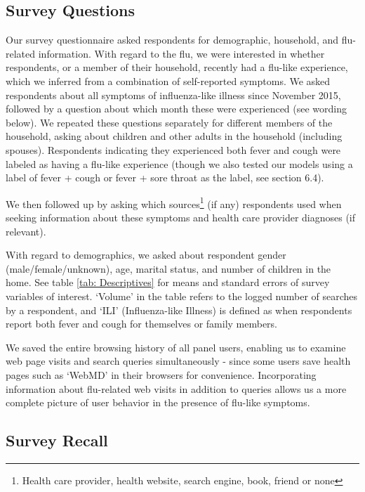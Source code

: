 \documentclass[12pt]{article}
\begin{document}
\subsection{Survey Questions}

Our survey questionnaire asked respondents for demographic, household, and flu-related information. With regard to the flu, we were interested in whether respondents, or a member of their household, recently had a flu-like experience, which we inferred from a combination of self-reported symptoms. We asked respondents about all symptoms of influenza-like illness since November 2015, followed by a question about which month these were experienced (see wording below). We repeated these questions separately for different members of the household, asking about children and other adults in the household (including spouses). Respondents indicating they experienced both fever and cough were labeled as having a flu-like experience (though we also tested our models using a label of fever + cough or fever + sore throat as the label, see section 6.4). 

We then followed up by asking which sources\footnote{Health care provider, health website, search engine, book, friend or none} (if any) respondents used when seeking information about these symptoms and health care provider diagnoses (if relevant). %

With regard to demographics, we asked about respondent gender (male/female/unknown), age, marital status, and number of children in the home. See table \ref{tab: Descriptives} for means and standard errors of survey variables of interest. `Volume' in the table refers to the logged number of searches by a respondent, and `ILI' (Influenza-like Illness) is defined as when respondents report both fever and cough for themselves or family members.

We saved the entire browsing history of all panel users, enabling us to examine web page visits and search queries simultaneously - since some users save health pages such as `WebMD' in their browsers for convenience. Incorporating information about flu-related web visits in addition to queries allows us a more complete picture of user behavior in the presence of flu-like symptoms.  

\subsection{Survey Recall}
\end{document}
